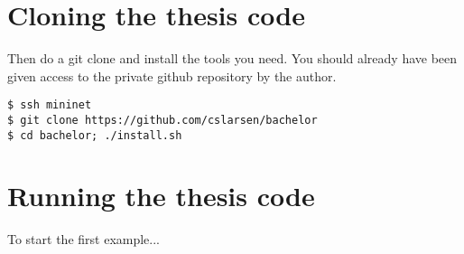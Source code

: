 \section{Cloning the thesis code}

Then do a git clone and install the tools you need. You should already have
been given access to the private github repository by the author.

\begin{Verbatim}
$ ssh mininet
$ git clone https://github.com/cslarsen/bachelor
$ cd bachelor; ./install.sh
\end{Verbatim}

\section{Running the thesis code}

To start the first example...

